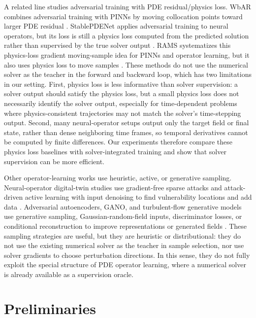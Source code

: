 \documentclass[letterpaper]{article} %
\begin{document}
A related line studies adversarial training with PDE residual/physics loss.
WbAR combines adversarial training with PINNs by moving collocation points
toward larger PDE residual \citep{shi2025wbar}. StablePDENet applies
adversarial training to neural operators, but its loss is still a physics loss
computed from the predicted solution rather than supervised by the true solver
output \citep{huang2026stablepdenet}. RAMS systematizes this physics-loss
gradient moving-sample idea for PINNs and operator learning, but it also uses
physics loss to move samples \citep{ouyang2025rams}. These methods do not use
the numerical solver as the teacher in the forward and backward loop, which has
two limitations in our setting. First, physics loss is less informative than
solver supervision: a solver output should satisfy the physics loss, but a
small physics loss does not necessarily identify the solver output, especially
for time-dependent problems where physics-consistent trajectories may not match
the solver's time-stepping output. Second, many neural-operator setups output
only the target field or final state, rather than dense neighboring time frames,
so temporal derivatives cannot be computed by finite differences. Our
experiments therefore compare these physics loss baselines with solver-integrated
training and show that solver supervision can be more efficient.

Other operator-learning works use heuristic, active, or generative sampling.
Neural-operator digital-twin studies use gradient-free sparse attacks and
attack-driven active learning with input denoising to find vulnerability
locations and add data \citep{roy2026vulnerabilities,roy2026beyond}.
Adversarial autoencoders, GANO, and turbulent-flow generative models use
generative sampling, Gaussian-random-field inputs, discriminator losses, or
conditional reconstruction to improve representations or generated fields
\citep{enyeart2024adversarial,rahman2022gano,oommen2025turbulent}. These
sampling strategies are useful, but they are heuristic or distributional: they
do not use the existing numerical solver as the teacher in sample selection,
nor use solver gradients to choose perturbation directions. In this sense, they
do not fully exploit the special structure of PDE operator learning, where a
numerical solver is already available as a supervision oracle.

\section{Preliminaries}
\end{document}

